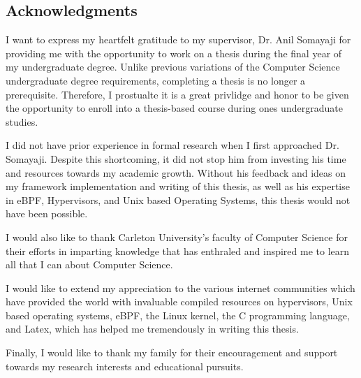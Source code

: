 \documentclass{report}
\begin{document}
\begin{spacing}{1.5}






\newpage

\chapter*{Acknowledgments}

{\large I want to express my heartfelt gratitude to my supervisor, Dr. Anil Somayaji for providing me with the opportunity to work on a thesis during the final year of my undergraduate degree. Unlike previous variations of the Computer Science undergraduate degree requirements, completing a thesis is no longer a prerequisite. Therefore, I prostualte it is a great privlidge and honor to be given the opportunity to enroll into a thesis-based course during ones undergraduate studies.}

{\large I did not have prior experience in formal research when I first approached Dr. Somayaji. Despite this shortcoming, it did not stop him from investing his time and resources towards my academic growth. Without his feedback and ideas on my framework implementation and writing of this thesis, as well as his expertise in eBPF, Hypervisors, and Unix based Operating Systems, this thesis would not have been possible.}

{\large I would also like to thank Carleton University's faculty of Computer Science for their efforts in imparting knowledge that has enthraled and inspired me to learn all that I can about Computer Science.}

{\large I would like to extend my appreciation to the various internet communities which have provided the world with invaluable compiled resources on hypervisors, Unix based operating systems, eBPF, the Linux kernel, the C programming language, and Latex, which has helped me tremendously in writing this thesis.}

{\large Finally, I would like to thank my family for their encouragement and support towards my research interests and educational pursuits.}




\tableofcontents
\newpage


{}
\listoffigures
\newpage


{}
\listoftables
\newpage




\end{spacing}
\end{document}
